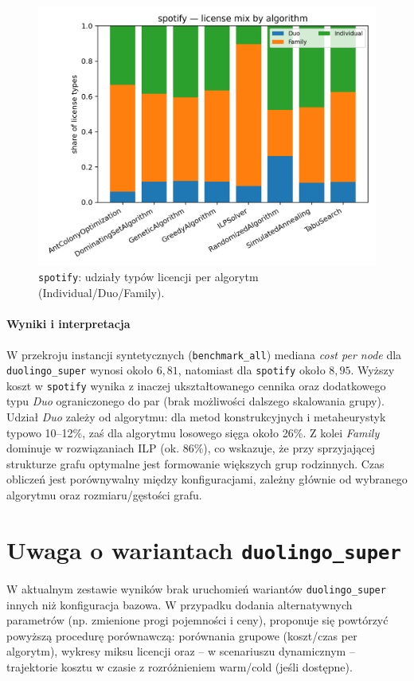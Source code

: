\begin{figure}[H]
  \centering
  \includegraphics[width=0.75\linewidth]{assets/figures/extensions/spotify_license_mix.png}
  \caption{\texttt{spotify}: udziały typów licencji per algorytm (Individual/Duo/Family).}
  \label{fig:spotify_mix}
\end{figure}

\paragraph{Wyniki i interpretacja}
W przekroju instancji syntetycznych (\texttt{benchmark\_all}) mediana \textit{cost per node} dla \texttt{duolingo\_super} wynosi około $6{,}81$, natomiast dla \texttt{spotify} około $8{,}95$. Wyższy koszt w \texttt{spotify} wynika z inaczej ukształtowanego cennika oraz dodatkowego typu \emph{Duo} ograniczonego do par (brak możliwości dalszego skalowania grupy). Udział \emph{Duo} zależy od algorytmu: dla metod konstrukcyjnych i metaheurystyk typowo 10–12\%, zaś dla algorytmu losowego sięga około 26\%. Z kolei \emph{Family} dominuje w rozwiązaniach ILP (ok. 86\%), co wskazuje, że przy sprzyjającej strukturze grafu optymalne jest formowanie większych grup rodzinnych. Czas obliczeń jest porównywalny między konfiguracjami, zależny głównie od wybranego algorytmu oraz rozmiaru/gęstości grafu.

\section{Uwaga o wariantach \texttt{duolingo\_super}}

W aktualnym zestawie wyników brak uruchomień wariantów \texttt{duolingo\_super} innych niż konfiguracja bazowa. W przypadku dodania alternatywnych parametrów (np. zmienione progi pojemności i ceny), proponuje się powtórzyć powyższą procedurę porównawczą: porównania grupowe (koszt/czas per algorytm), wykresy miksu licencji oraz – w scenariuszu dynamicznym – trajektorie kosztu w czasie z rozróżnieniem warm/cold (jeśli dostępne).

